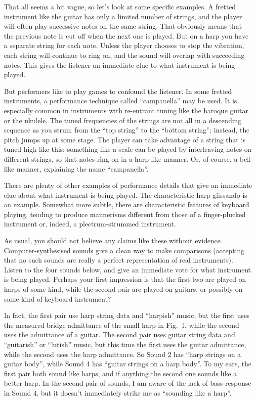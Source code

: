  That all seems a bit vague, so let’s look at some specific examples. A 
  fretted instrument like the guitar has only a limited number of strings, and 
  the player will often play successive notes on the same string. That 
  obviously means that the previous note is cut off when the next one is 
  played. But on a harp you have a separate string for each note. Unless the 
  player chooses to stop the vibration, each string will continue to ring on, 
  and the sound will overlap with succeeding notes. This gives the listener an 
  immediate clue to what instrument is being played. 

  But performers like to play games to confound the listener. In some fretted 
  instruments, a performance technique called “campanella” may be used. It is 
  especially common in instruments with re-entrant tuning like the baroque 
  guitar or the ukulele. The tuned frequencies of the strings are not all in a 
  descending sequence as you strum from the “top string” to the “bottom 
  string”; instead, the pitch jumps up at some stage. The player can take 
  advantage of a string that is tuned high like this: something like a scale 
  can be played by interleaving notes on different strings, so that notes ring 
  on in a harp-like manner. Or, of course, a bell-like manner, explaining the 
  name “campanella”. 

  There are plenty of other examples of performance details that give an 
  immediate clue about what instrument is being played. The characteristic harp 
  glissando is an example. Somewhat more subtle, there are characteristic 
  features of keyboard playing, tending to produce mannerisms different from 
  those of a finger-plucked instrument or, indeed, a plectrum-strummed 
  instrument. 

  As usual, you should not believe any claims like these without evidence. 
  Computer-synthesised sounds give a clean way to make comparisons (accepting 
  that no such sounds are really a perfect representation of real instruments). 
  Listen to the four sounds below, and give an immediate vote for what 
  instrument is being played. Perhaps your first impression is that the first 
  two are played on harps of some kind, while the second pair are played on 
  guitars, or possibly on some kind of keyboard instrument? 

  In fact, the first pair use harp string data and ``harpish'' music, but the 
  first uses the measured bridge admittance of the small harp in Fig.\ 1, while 
  the second uses the admittance of a guitar. The second pair uses guitar 
  string data and ``guitarish'' or ``lutish'' music, but this time the first 
  uses the guitar admittance, while the second uses the harp admittance. So 
  Sound 2 has ``harp strings on a guitar body'', while Sound 4 has ``guitar 
  strings on a harp body''. To my ears, the first pair both sound like harps, 
  and if anything the second one sounds like a better harp. In the second pair 
  of sounds, I am aware of the lack of bass response in Sound 4, but it doesn't 
  immediately strike me as ``sounding like a harp''. 

